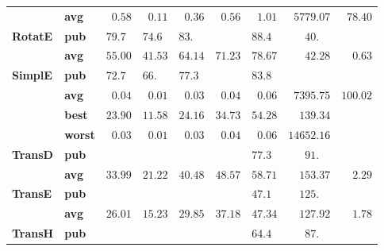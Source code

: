 \begin{tabular}{llrrrrrrr}
       & \textbf{avg} &  $\phantom{0}0.58$ &  $\phantom{0}0.11$ &  $\phantom{0}0.36$ &  $\phantom{0}0.56$ &  $\phantom{0}1.01$ &            $\phantom{0}5779.07$ &  $\phantom{0}78.40$ \\
\textbf{RotatE} & \textbf{pub} &  $79.7\phantom{0}$ &  $74.6\phantom{0}$ &  $83.\phantom{00}$ &                    &  $88.4\phantom{0}$ &  $\phantom{000}40.\phantom{00}$ &                     \\
       & \textbf{avg} &            $55.00$ &            $41.53$ &            $64.14$ &            $71.23$ &            $78.67$ &            $\phantom{000}42.28$ &  $\phantom{00}0.63$ \\
\textbf{SimplE} & \textbf{pub} &  $72.7\phantom{0}$ &  $66.\phantom{00}$ &  $77.3\phantom{0}$ &                    &  $83.8\phantom{0}$ &                                 &                     \\
       & \textbf{avg} &  $\phantom{0}0.04$ &  $\phantom{0}0.01$ &  $\phantom{0}0.03$ &  $\phantom{0}0.04$ &  $\phantom{0}0.06$ &            $\phantom{0}7395.75$ &            $100.02$ \\
       & \textbf{best} &            $23.90$ &            $11.58$ &            $24.16$ &            $34.73$ &            $54.28$ &            $\phantom{00}139.34$ &                     \\
       & \textbf{worst} &  $\phantom{0}0.03$ &  $\phantom{0}0.01$ &  $\phantom{0}0.03$ &  $\phantom{0}0.04$ &  $\phantom{0}0.06$ &                      $14652.16$ &                     \\
\textbf{TransD} & \textbf{pub} &                    &                    &                    &                    &  $77.3\phantom{0}$ &  $\phantom{000}91.\phantom{00}$ &                     \\
       & \textbf{avg} &            $33.99$ &            $21.22$ &            $40.48$ &            $48.57$ &            $58.71$ &            $\phantom{00}153.37$ &  $\phantom{00}2.29$ \\
\textbf{TransE} & \textbf{pub} &                    &                    &                    &                    &  $47.1\phantom{0}$ &  $\phantom{00}125.\phantom{00}$ &                     \\
       & \textbf{avg} &            $26.01$ &            $15.23$ &            $29.85$ &            $37.18$ &            $47.34$ &            $\phantom{00}127.92$ &  $\phantom{00}1.78$ \\
\textbf{TransH} & \textbf{pub} &                    &                    &                    &                    &  $64.4\phantom{0}$ &  $\phantom{000}87.\phantom{00}$ &                     \\

\end{tabular}
